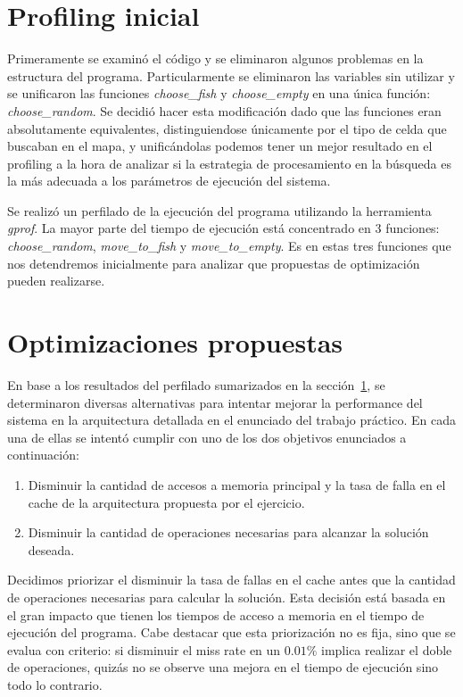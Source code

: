 \documentclass[a4paper,11pt]{article}
\begin{document}
\section{Profiling inicial} \label{sec:profinicial}

Primeramente se examinó el código y se eliminaron algunos problemas en la
estructura del programa. Particularmente se eliminaron las variables sin
utilizar y se unificaron las funciones \textit{choose\_fish} y
\textit{choose\_empty} en una única función: \textit{choose\_random}. Se
decidió hacer esta modificación dado que las funciones eran absolutamente
equivalentes, distinguiendose únicamente por el tipo de celda que buscaban en
el mapa, y unificándolas podemos tener un mejor resultado en el profiling a la
hora de analizar si la estrategia de procesamiento en la búsqueda es la más
adecuada a los parámetros de ejecución del sistema.

Se realizó un perfilado de la ejecución del programa utilizando la herramienta
\textit{gprof}. La mayor parte del tiempo de ejecución está concentrado en 3
funciones: \textit{choose\_random}, \textit{move\_to\_fish} y
\textit{move\_to\_empty}. Es en estas tres funciones que nos detendremos
inicialmente para analizar que propuestas de optimización pueden realizarse.

\section{Optimizaciones propuestas}

En base a los resultados del perfilado sumarizados en la sección~\ref{sec:profinicial}, se determinaron diversas alternativas para intentar mejorar la performance del sistema en la arquitectura detallada en el enunciado del trabajo práctico. En cada una de ellas se intentó cumplir con uno de los dos objetivos enunciados a continuación:

\begin{enumerate}

  \item Disminuir la cantidad de accesos a memoria principal y la tasa de falla
      en el cache de la arquitectura propuesta por el ejercicio.

  \item Disminuir la cantidad de operaciones necesarias para alcanzar la
      solución deseada.

\end{enumerate}

Decidimos priorizar el disminuir la tasa de fallas en el cache antes que la
cantidad de operaciones necesarias para calcular la solución. Esta decisión
está basada en el gran impacto que tienen los tiempos de acceso a memoria en el
tiempo de ejecución del programa. Cabe destacar que esta priorización no es
fija, sino que se evalua con criterio: si disminuir el miss rate en un
\(0.01\%\) implica realizar el doble de operaciones, quizás no se observe una
mejora en el tiempo de ejecución sino todo lo contrario.
\end{document}
